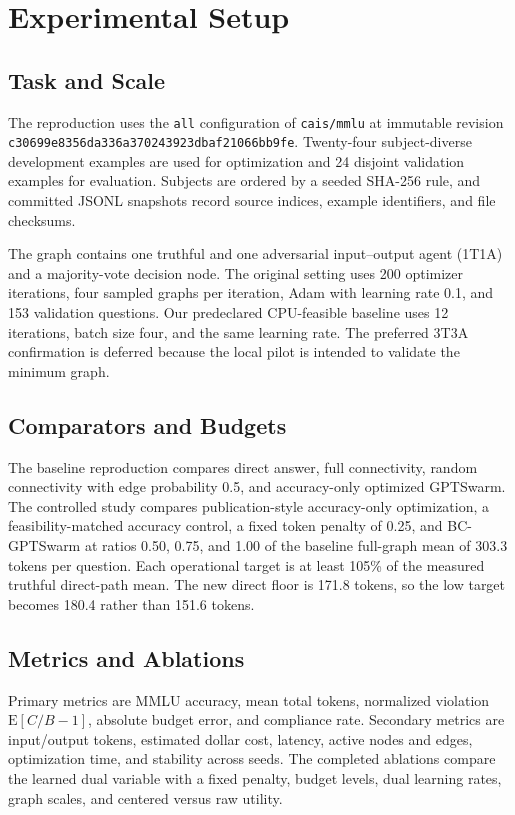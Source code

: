 \section{Experimental Setup}

\subsection{Task and Scale}

The reproduction uses the \texttt{all} configuration of \texttt{cais/mmlu} at immutable revision \texttt{c30699e8356da336a370243923dbaf21066bb9fe}. Twenty-four subject-diverse development examples are used for optimization and 24 disjoint validation examples for evaluation. Subjects are ordered by a seeded SHA-256 rule, and committed JSONL snapshots record source indices, example identifiers, and file checksums.

The graph contains one truthful and one adversarial input--output agent (1T1A) and a majority-vote decision node. The original setting uses 200 optimizer iterations, four sampled graphs per iteration, Adam with learning rate 0.1, and 153 validation questions. Our predeclared CPU-feasible baseline uses 12 iterations, batch size four, and the same learning rate. The preferred 3T3A confirmation is deferred because the local pilot is intended to validate the minimum graph.

\subsection{Comparators and Budgets}

The baseline reproduction compares direct answer, full connectivity, random connectivity with edge probability 0.5, and accuracy-only optimized GPTSwarm. The controlled study compares publication-style accuracy-only optimization, a feasibility-matched accuracy control, a fixed token penalty of 0.25, and BC-GPTSwarm at ratios 0.50, 0.75, and 1.00 of the baseline full-graph mean of 303.3 tokens per question. Each operational target is at least 105\% of the measured truthful direct-path mean. The new direct floor is 171.8 tokens, so the low target becomes 180.4 rather than 151.6 tokens.

\subsection{Metrics and Ablations}

Primary metrics are MMLU accuracy, mean total tokens, normalized violation $\mathrm{E}[C/B-1]$, absolute budget error, and compliance rate. Secondary metrics are input/output tokens, estimated dollar cost, latency, active nodes and edges, optimization time, and stability across seeds. The completed ablations compare the learned dual variable with a fixed penalty, budget levels, dual learning rates, graph scales, and centered versus raw utility.

